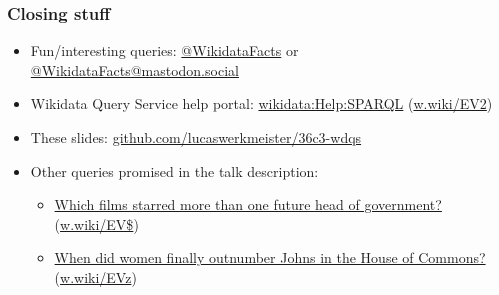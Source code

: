 \documentclass[aspectratio=169]{beamer}
\makeatletter
\newcommand{\Twitter}[1]{\href{https://twitter.com/#1}{@#1}}
\newcommand{\Mastodon}[2]{\href{https://#2/@#1}{@#1@#2}}
\newcommand{\wwiki}[1]{\href{https://w.wiki/#1}{w.wiki/#1}}
\makeatother
\begin{document}
\begin{frame}
  \frametitle{Closing stuff}
  \begin{itemize}
  \item Fun/interesting queries: \Twitter{WikidataFacts} or \Mastodon{WikidataFacts}{mastodon.social}
  \item Wikidata Query Service help portal: \href{https://www.wikidata.org/wiki/Special:MyLanguage/Wikidata:SPARQL_query_service/Wikidata_Query_Help}{wikidata:Help:SPARQL} (\wwiki{EV2})
  \item These slides: \href{https://github.com/lucaswerkmeister/36c3-wdqs}{github.com/lucaswerkmeister/36c3-wdqs}
  \item Other queries promised in the talk description:
    \begin{itemize}
    \item \href{https://www.wikidata.org/wiki/User:TweetsFactsAndQueries/Queries/films_starring_more_than_one_future_head_of_government}{Which films starred more than one future head of government?} (\wwiki{EV\$})
    \item \href{https://www.wikidata.org/wiki/User:TweetsFactsAndQueries/Queries/UK_parliaments_with_count_of_Johns_and_count_of_women}{When did women finally outnumber Johns in the House of Commons?} (\wwiki{EVz})
    \end{itemize}
  \end{itemize}
\end{frame}
\end{document}
